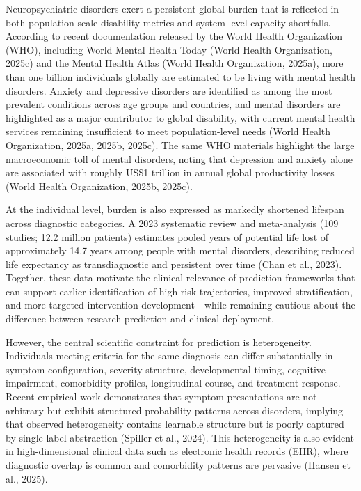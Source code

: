 \documentclass[11pt,a4paper,twoside]{article}
\begin{document}
Neuropsychiatric disorders exert a persistent global burden that is reflected in both population-scale disability metrics and system-level capacity shortfalls. According to recent documentation released by the World Health Organization (WHO), including World Mental Health Today (World Health Organization, 2025c) and the Mental Health Atlas (World Health Organization, 2025a), more than one billion individuals globally are estimated to be living with mental health disorders. Anxiety and depressive disorders are identified as among the most prevalent conditions across age groups and countries, and mental disorders are highlighted as a major contributor to global disability, with current mental health services remaining insufficient to meet population-level needs (World Health Organization, 2025a, 2025b, 2025c). The same WHO materials highlight the large macroeconomic toll of mental disorders, noting that depression and anxiety alone are associated with roughly US\$1 trillion in annual global productivity losses (World Health Organization, 2025b, 2025c).

At the individual level, burden is also expressed as markedly shortened lifespan across diagnostic categories. A 2023 systematic review and meta-analysis (109 studies; 12.2 million patients) estimates pooled years of potential life lost of approximately 14.7 years among people with mental disorders, describing reduced life expectancy as transdiagnostic and persistent over time (Chan et al., 2023). Together, these data motivate the clinical relevance of prediction frameworks that can support earlier identification of high-risk trajectories, improved stratification, and more targeted intervention development---while remaining cautious about the difference between research prediction and clinical deployment.

However, the central scientific constraint for prediction is heterogeneity. Individuals meeting criteria for the same diagnosis can differ substantially in symptom configuration, severity structure, developmental timing, cognitive impairment, comorbidity profiles, longitudinal course, and treatment response. Recent empirical work demonstrates that symptom presentations are not arbitrary but exhibit structured probability patterns across disorders, implying that observed heterogeneity contains learnable structure but is poorly captured by single-label abstraction (Spiller et al., 2024). This heterogeneity is also evident in high-dimensional clinical data such as electronic health records (EHR), where diagnostic overlap is common and comorbidity patterns are pervasive (Hansen et al., 2025).
\end{document}
